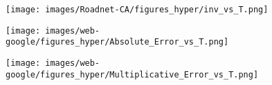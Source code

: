 \begin{figure*}[htbp]
\begin{subfigure}[b]{\textwidth}
\begin{minipage}[b]{0.3\textwidth}
			\texttt{[image: images/Roadnet-CA/figures\_hyper/inv\_vs\_T.png]} %
		\end{minipage}
	\end{subfigure}
	\begin{subfigure}[b]{\textwidth}
	\centering
	\begin{minipage}[b]{0.05\textwidth}
		\centering
	\end{minipage}%
	\begin{minipage}[b]{0.3\textwidth}
		\centering
		\texttt{[image: images/web-google/figures\_hyper/Absolute\_Error\_vs\_T.png]} %
		
	\end{minipage}%
	\begin{minipage}[b]{0.3\textwidth}
		\centering
		
		\texttt{[image: images/web-google/figures\_hyper/Multiplicative\_Error\_vs\_T.png]} %
		
	\end{minipage}%
	\begin{minipage}[b]{0.3\textwidth}
		\centering
		

\end{minipage}
\end{subfigure}
\end{figure*}
